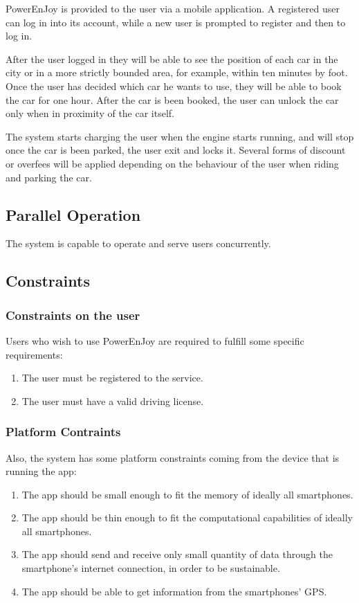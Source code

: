 \documentclass[11pt]{article} %
\newcommand{\pe}{PowerEnJoy }
\begin{document}
  \pe is provided to the user via a mobile application. A registered user can log in into its account, while a new user is prompted to register and then to log in.
  
  After the user logged in they will be able to see the position of each car in the city or in a more strictly bounded area, for example, within ten minutes by foot. Once the user has decided which car he wants to use, they will be able to book the car for one hour. After the car is been booked, the user can unlock the car only when in proximity of the car itself.
  
  The system starts charging the user when the engine starts running, and will stop once the car is been parked, the user exit and locks it. Several forms of discount or overfees will be applied depending on the behaviour of the user when riding and parking the car.


\subsection{Parallel Operation}
  The system is capable to operate and serve users concurrently.
 
\subsection{Constraints}
  
	\subsubsection{Constraints on the user}
Users who wish to use \pe are required to fulfill some specific requirements:
\begin{enumerate}
	\item The user must be registered to the service.
	\item The user must have a valid driving license.
\end{enumerate}

	\subsubsection{Platform Contraints}
Also, the system has some platform constraints coming from the device that is running the app:
\begin{enumerate}
	\item The app should be small enough to fit the memory of ideally all smartphones.
	\item The app should be thin enough to fit the computational capabilities of ideally all smartphones.
	\item The app should send and receive only small quantity of data through the smartphone's internet connection, in order to be sustainable.
	\item The app should be able to get information from the smartphones' GPS.
  \end{enumerate}
\end{document}
